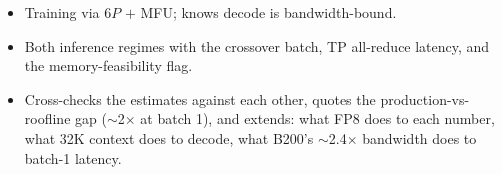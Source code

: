 \begin{interviewq}

\goodgreat
\begin{itemize}
    \item {} Training via $6P$ $+$ MFU; knows decode is bandwidth-bound.
    \item {} Both inference regimes with the crossover batch, TP all-reduce latency, and the memory-feasibility flag.
    \item {} Cross-checks the estimates against each other, quotes the production-vs-roofline gap ($\sim$2$\times$ at batch 1), and extends: what FP8 does to each number, what 32K context does to decode, what B200's $\sim$2.4$\times$ bandwidth does to batch-1 latency.
\end{itemize}

\end{interviewq}

